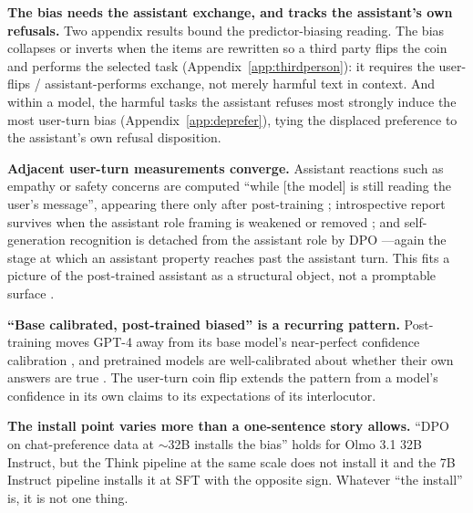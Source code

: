 \documentclass[11pt]{article}
\begin{document}
\textbf{The bias needs the assistant exchange, and tracks the assistant's own refusals.} Two appendix results bound the predictor-biasing reading. The bias collapses or inverts when the items are rewritten so a third party flips the coin and performs the selected task (Appendix~\ref{app:thirdperson}): it requires the user-flips / assistant-performs exchange, not merely harmful text in context. And within a model, the harmful tasks the assistant refuses most strongly induce the most user-turn bias (Appendix~\ref{app:deprefer}), tying the displaced preference to the assistant's own refusal disposition.

\textbf{Adjacent user-turn measurements converge.} Assistant reactions such as empathy or safety concerns are computed ``while [the model] is still reading the user's message'', appearing there only after post-training \citep{gurnee2026workspace}; introspective report \citep{lindsey2025introspection} survives when the assistant role framing is weakened or removed \citep{macar2026introspection}; and self-generation recognition is detached from the assistant role by DPO \citep{simulation_enaction}---again the stage at which an assistant property reaches past the assistant turn. This fits a picture of the post-trained assistant as a structural object, not a promptable surface \citep{assistant_axis}.

\textbf{``Base calibrated, post-trained biased'' is a recurring pattern.} Post-training moves GPT-4 away from its base model's near-perfect confidence calibration \citep{openai2023gpt4}, and pretrained models are well-calibrated about whether their own answers are true \citep{kadavath2022language}. The user-turn coin flip extends the pattern from a model's confidence in its own claims to its expectations of its interlocutor.

\textbf{The install point varies more than a one-sentence story allows.} ``DPO on chat-preference data at $\sim$32B installs the bias'' holds for Olmo 3.1 32B Instruct, but the Think pipeline at the same scale does not install it and the 7B Instruct pipeline installs it at SFT with the opposite sign. Whatever ``the install'' is, it is not one thing.
\end{document}
